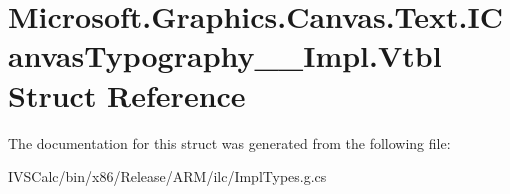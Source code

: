 \hypertarget{struct_microsoft_1_1_graphics_1_1_canvas_1_1_text_1_1_i_canvas_typography_____impl_1_1_vtbl}{}\section{Microsoft.\+Graphics.\+Canvas.\+Text.\+I\+Canvas\+Typography\+\_\+\+\_\+\+Impl.\+Vtbl Struct Reference}
\label{struct_microsoft_1_1_graphics_1_1_canvas_1_1_text_1_1_i_canvas_typography_____impl_1_1_vtbl}


The documentation for this struct was generated from the following file\+:\begin{DoxyCompactItemize}
\item 
I\+V\+S\+Calc/bin/x86/\+Release/\+A\+R\+M/ilc/Impl\+Types.\+g.\+cs\end{DoxyCompactItemize}
